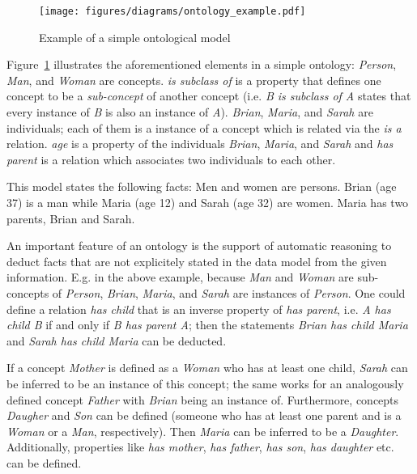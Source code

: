 \vspace{1em}

\begin{figure}
\centering
\texttt{[image: figures/diagrams/ontology\_example.pdf]}
\caption{Example of a simple ontological model}
\label{fig:ontology_example}
\end{figure}

Figure~\ref{fig:ontology_example} illustrates the aforementioned elements in a simple ontology: \emph{Person}, \emph{Man}, and \emph{Woman} are concepts. \emph{is subclass of} is a property that defines one concept to be a \emph{sub-concept} of another concept (i.e. \emph{B is subclass of A} states that every instance of \emph{B} is also an instance of \emph{A}). \emph{Brian}, \emph{Maria}, and \emph{Sarah} are individuals; each of them is a instance of a concept which is related via the \emph{is a} relation. \emph{age} is a property of the individuals \emph{Brian}, \emph{Maria}, and \emph{Sarah} and \emph{has parent} is a relation which associates two individuals to each other.

This model states the following facts: Men and women are persons. Brian (age 37) is a man while Maria (age 12) and Sarah (age 32) are women. Maria has two parents, Brian and Sarah.

\vspace{1em}

An important feature of an ontology is the support of automatic reasoning to deduct facts that are not explicitely stated in the data model from the given information. E.g. in the above example, because \emph{Man} and \emph{Woman} are sub-concepts of \emph{Person}, \emph{Brian}, \emph{Maria}, and \emph{Sarah} are instances of \emph{Person}. One could define a relation \emph{has child} that is an inverse property of \emph{has parent}, i.e. \emph{A has child B} if and only if \emph{B has parent A}; then the statements \emph{Brian has child Maria} and \emph{Sarah has child Maria} can be deducted.

If a concept \emph{Mother} is defined as a \emph{Woman} who has at least one child, \emph{Sarah} can be inferred to be an instance of this concept; the same works for an analogously defined concept \emph{Father} with \emph{Brian} being an instance of. Furthermore, concepts \emph{Daugher} and \emph{Son} can be defined (someone who has at least one parent and is a \emph{Woman} or a \emph{Man}, respectively). Then \emph{Maria} can be inferred to be a \emph{Daughter}. Additionally, properties like \emph{has mother}, \emph{has father}, \emph{has son}, \emph{has daughter} etc. can be defined.

